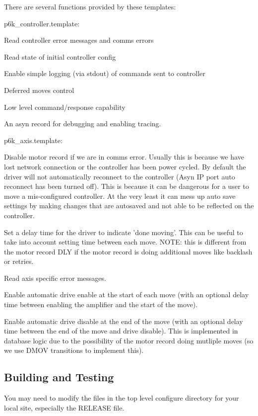 There are several functions provided by these templates:

p6k\_\-controller.template: 
\begin{DoxyItemize}
\item Read controller error messages and comms errors 
\item Read state of initial controller config 
\item Enable simple logging (via stdout) of commands sent to controller 
\item Deferred moves control 
\item Low level command/response capability 
\item An asyn record for debugging and enabling tracing. 
\end{DoxyItemize}

p6k\_\-axis.template: 
\begin{DoxyItemize}
\item Disable motor record if we are in comms error. Usually this is because we have lost network connection or the controller has been power cycled. By default the driver will not automatically reconnect to the controller (Asyn IP port auto reconnect has been turned off). This is because it can be dangerous for a user to move a mis-\/configured controller. At the very least it can mess up auto save settings by making changes that are autosaved and not able to be reflected on the controller. 
\item Set a delay time for the driver to indicate 'done moving'. This can be useful to take into account setting time between each move. NOTE: this is different from the motor record DLY if the motor record is doing additional moves like backlash or retries. 
\item Read axis specific error messages. 
\item Enable automatic drive enable at the start of each move (with an optional delay time between enabling the amplifier and the start of the move). 
\item Enable automatic drive disable at the end of the move (with an optional delay time between the end of the move and drive disable). This is implemented in database logic due to the possibility of the motor record doing mutliple moves (so we use DMOV transitions to implement this). 
\end{DoxyItemize}\hypertarget{index_building}{}\subsection{Building and Testing}\label{index_building}
You may need to modify the files in the top level configure directory for your local site, especially the RELEASE file.

